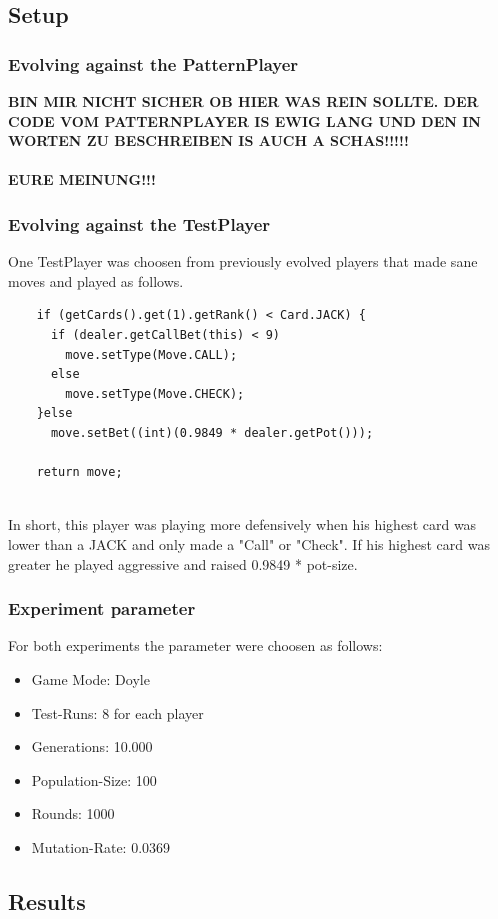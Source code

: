 \documentclass[12pt,fleqn,a4paper]{article}
\begin{document}
\subsection{Setup}
\subsubsection{Evolving against the PatternPlayer}
\textbf{ BIN MIR NICHT SICHER OB HIER WAS REIN SOLLTE. DER CODE VOM PATTERNPLAYER IS EWIG LANG UND DEN IN WORTEN ZU BESCHREIBEN IS AUCH A SCHAS!!!!! \\ \\
	EURE MEINUNG!!!}
\subsubsection{Evolving against the TestPlayer}
One TestPlayer was choosen from previously evolved players that made sane moves and played as follows.
\\
\begin{lstlisting}
	if (getCards().get(1).getRank() < Card.JACK) {
	  if (dealer.getCallBet(this) < 9)
		move.setType(Move.CALL);
	  else
		move.setType(Move.CHECK);
	}else
	  move.setBet((int)(0.9849 * dealer.getPot()));
		
	return move;
\end{lstlisting}
\\
In short, this player was playing more defensively when his highest card was lower than a JACK and only made a "Call" or "Check". If his highest card was greater he played aggressive and raised 0.9849 * pot-size.

\subsubsection{Experiment parameter}
For both experiments the parameter were choosen as follows: \\
\begin{itemize}
	\item Game Mode:       Doyle
	\item Test-Runs:       8 for each player
	\item Generations:     10.000
	\item Population-Size: 100
	\item Rounds:          1000
	\item Mutation-Rate:   0.0369
\end{itemize}

\subsection{Results}
\end{document}
